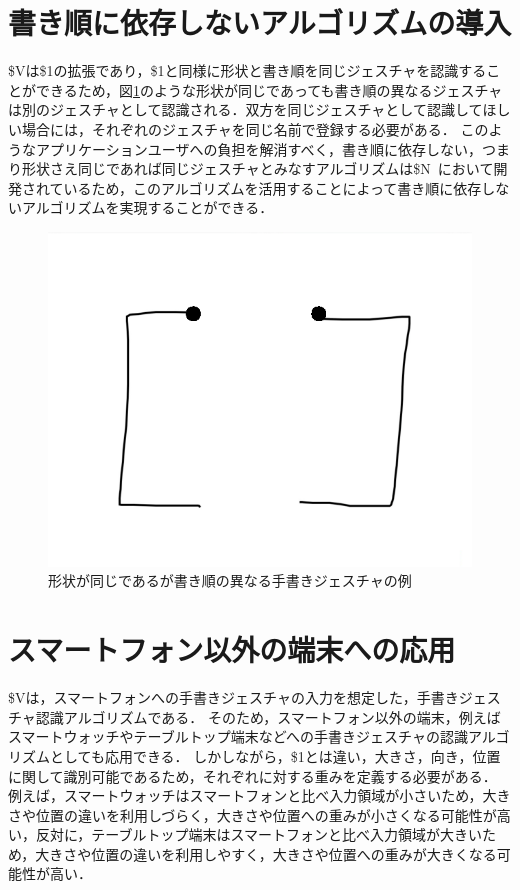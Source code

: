 \section{書き順に依存しないアルゴリズムの導入}
\$Vは\$1の拡張であり，\$1と同様に形状と書き順を同じジェスチャを認識することができるため，図\ref{fig:different_direction}のような形状が同じであっても書き順の異なるジェスチャは別のジェスチャとして認識される．双方を同じジェスチャとして認識してほしい場合には，それぞれのジェスチャを同じ名前で登録する必要がある．
このようなアプリケーションユーザへの負担を解消すべく，書き順に依存しない，つまり形状さえ同じであれば同じジェスチャとみなすアルゴリズムは\$N~\cite{Anthony:2010:LMR:1839214.1839258}において開発されているため，このアルゴリズムを活用することによって書き順に依存しないアルゴリズムを実現することができる．

\begin{figure} [h!]
	\begin{center}
		\includegraphics [width=0.5\hsize ]{img/different_direction.eps}
	\end{center}
	\caption{形状が同じであるが書き順の異なる手書きジェスチャの例}
	\label{fig:different_direction}
\end{figure}


\section{スマートフォン以外の端末への応用}
\$Vは，スマートフォンへの手書きジェスチャの入力を想定した，手書きジェスチャ認識アルゴリズムである．
そのため，スマートフォン以外の端末，例えばスマートウォッチやテーブルトップ端末などへの手書きジェスチャの認識アルゴリズムとしても応用できる．
しかしながら，\$1とは違い，大きさ，向き，位置に関して識別可能であるため，それぞれに対する重みを定義する必要がある．
例えば，スマートウォッチはスマートフォンと比べ入力領域が小さいため，大きさや位置の違いを利用しづらく，大きさや位置への重みが小さくなる可能性が高い，反対に，テーブルトップ端末はスマートフォンと比べ入力領域が大きいため，大きさや位置の違いを利用しやすく，大きさや位置への重みが大きくなる可能性が高い．


